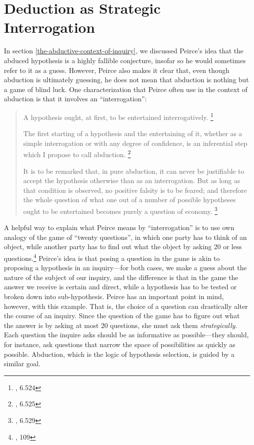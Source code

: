 \section{Deduction as Strategic Interrogation}\label{strategicint}

In section \ref{the-abductive-context-of-inquiry}, we discussed Peirce's idea that the abduced hypothesis is a highly fallible conjecture, insofar so he would sometimes refer to it as a guess. However, Peirce also makes it clear that, even though abduction is ultimately guessing, he does not mean that abduction is nothing but a game of blind luck. One characterization that Peirce often use in the context of abduction is that it involves an ``interrogation'':

\begin{quote}
	A hypothesis ought, at first, to be entertained interrogatively. \footnote{\cite{CP}, 6.524}
	
	The first starting of a hypothesis and the entertaining of it, whether as a simple interrogation or with any degree of confidence, is an inferential step which I propose to call abduction.	 \footnote{\cite{CP}, 6.525}
	
	It is to be remarked that, in pure abduction, it can never be justifiable to accept the hypothesis otherwise than as an interrogation. But as long as that condition is observed, no positive falsity is to be feared; and therefore the whole question of what one out of a number of possible hypotheses ought to be entertained becomes purely a question of economy.	\footnote{\cite{CP}, 6.529}
\end{quote}

A helpful way to explain what Peirce means by ``interrogation'' is to use own analogy of the game of ``twenty questions'', in which one party has to think of an object, while another party has to find out what the object by asking 20 or less questions.\footnote{\cite{essentialpeirce2}, 109} Peirce's idea is that posing a question in the game is akin to proposing a hypothesis in an inquiry---for both cases, we make a guess about the nature of the subject of our inquiry, and the difference is that in the game the answer we receive is certain and direct, while a hypothesis has to be tested or broken down into sub-hypothesis. Peirce has an important point in mind, however, with this example. That is, the choice of a question can drastically alter the course of an inquiry. Since the question of the game has to figure out what the answer is by asking at most 20 questions, she must ask them \emph{strategically}. Each question the inquire asks should be as informative as possible---they should, for instance, ask questions that narrow the space of possibilities as quickly as possible. Abduction, which is the logic of hypothesis selection, is guided by a similar goal.

